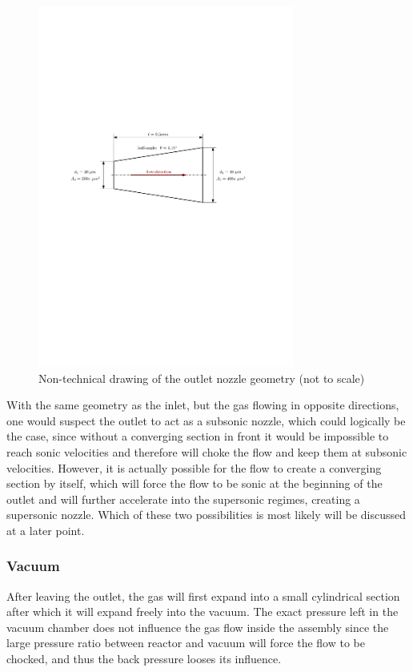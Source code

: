 	\begin{figure}[H]
	    \centering
	    \includegraphics[width=0.75\textwidth]{src/03_analytical-work/fig_outlet-nozzle-geometry.pdf}
	    \caption{Non-technical drawing of the outlet nozzle geometry (not to scale)}
	    \label{fig:geometry-outlet-nozzle}
	\end{figure}
	With the same geometry as the inlet, but the gas flowing in opposite directions, one would suspect the outlet to act as a subsonic nozzle, which could logically be the case, since without a converging section in front it would be impossible to reach sonic velocities and therefore will choke the flow and keep them at subsonic velocities.
	However, it is actually possible for the flow to create a converging section by itself, which will force the flow to be sonic at the beginning of the outlet and will further accelerate into the supersonic regimes, creating a supersonic nozzle.
	Which of these two possibilities is most likely will be discussed at a later point.
	
\subsubsection*{Vacuum}

	After leaving the outlet, the gas will first expand into a small cylindrical section after which it will expand freely into the vacuum.
	The exact pressure left in the vacuum chamber does not influence the gas flow inside the assembly since the large pressure ratio between reactor and vacuum will force the flow to be chocked, and thus the back pressure looses its influence.
